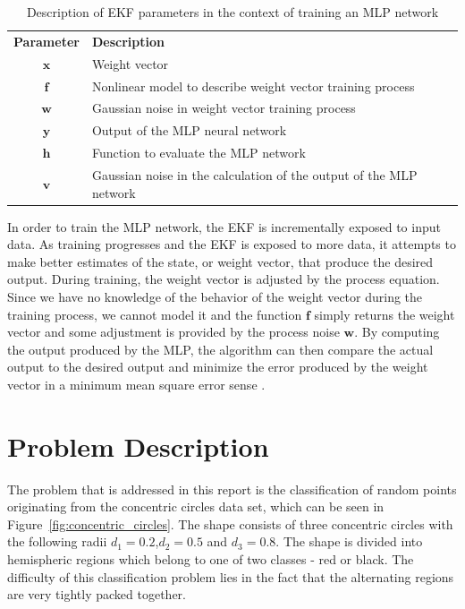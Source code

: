 \documentclass[11pt,letterpaper,titlepage]{article}
\numberwithin{equation}{section}
\numberwithin{figure}{section}
\numberwithin{table}{section}
\begin{document}
\begin{table}[ht]
  \centering
  \begin{tabular}{ c l }
    \rowcolor[gray]{0.8}
    \textbf{Parameter} & \textbf{Description} \\
    \(\mathbf{x}\) & Weight vector \\
    \(\mathbf{f}\) & Nonlinear model to describe weight vector training process \\
    \(\mathbf{w}\) & Gaussian noise in weight vector training process \\
    \(\mathbf{y}\) & Output of the MLP neural network \\
    \(\mathbf{h}\) & Function to evaluate the MLP network \\
    \(\mathbf{v}\) & Gaussian noise in the calculation of the output of the MLP network
  \end{tabular}
  \caption{Description of EKF parameters in the context of training an MLP network}
  \label{table:ekf_parameters}
\end{table}

In order to train the MLP network, the EKF is incrementally exposed to input data. As training progresses and the EKF is exposed to more data, it attempts to make better estimates of the state, or weight vector, that produce the desired output. During training, the weight vector is adjusted by the process equation. Since we have no knowledge of the behavior of the weight vector during the training process, we cannot model it and the function \(\mathbf{f}\) simply returns the weight vector and some adjustment is provided by the process noise \(\mathbf{w}\). By computing the output produced by the MLP, the algorithm can then compare the actual output to the desired output and minimize the error produced by the weight vector in a minimum mean square error sense \cite{Haykin2008}.

\section{Problem Description}

The problem that is addressed in this report is the classification of random points originating from the concentric circles data set, which can be seen in Figure~\ref{fig:concentric_circles}. The shape consists of three concentric circles with the following radii \(d_1=0.2\),\(d_2=0.5\) and \(d_3=0.8\). The shape is divided into hemispheric regions which belong to one of two classes - red or black. The difficulty of this classification problem lies in the fact that the alternating regions are very tightly packed together.
\end{document}
